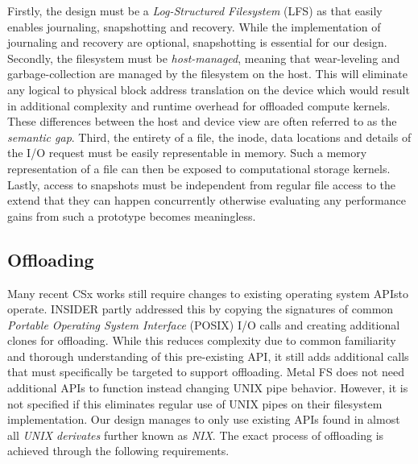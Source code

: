 Firstly, the design must be a \textit{Log-Structured Filesystem} (LFS) as that
easily enables journaling, snapshotting and recovery. While the implementation
of journaling and recovery are optional, snapshotting is essential for our
design. Secondly, the filesystem must be \textit{host-managed}, meaning that
wear-leveling and garbage-collection are managed by the filesystem on the host.
This will eliminate any logical to physical block address translation on the
device which would result in additional complexity and runtime overhead for
offloaded compute kernels. These differences between the host and device view
are often referred to as the \textit{semantic gap}. Third, the entirety of a
file, the inode, data locations and details of the I/O request must be easily
representable in memory. Such a memory representation of a file can then be
exposed to computational storage kernels. Lastly, access to snapshots must be
independent from regular file access to the extend that they can happen
concurrently otherwise evaluating any performance gains from such a prototype
becomes meaningless.

\subsection{Offloading}

Many recent CSx works still require changes to existing operating system
APIs\footnotemark[9] to operate. INSIDER \cite{234968} partly addressed this by
copying the signatures of common \textit{Portable Operating System Interface}
(POSIX) I/O calls and creating additional clones for offloading. While this
reduces complexity due to common familiarity and thorough understanding of
this pre-existing API, it still adds additional calls that must specifically be
targeted to support offloading. Metal FS \cite{10.1145/3415580} does not need
additional APIs to function instead changing UNIX pipe behavior. However, it is
not specified if this eliminates regular use of UNIX pipes on their filesystem
implementation. Our design manages to only use existing APIs found in almost all
\textit{UNIX derivates} further known as \textit{NIX}. The exact process of
offloading is achieved through the following requirements.


